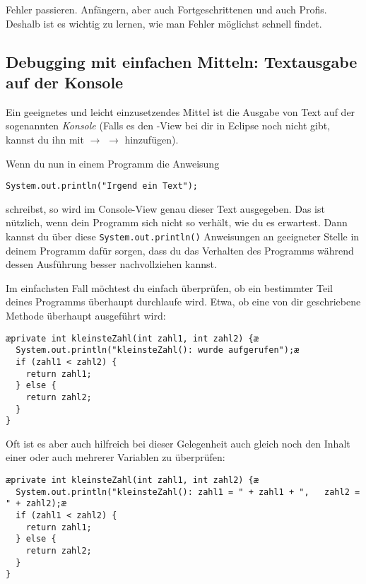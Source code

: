 Fehler passieren. Anfängern, aber auch Fortgeschrittenen und auch Profis.
Deshalb ist es wichtig zu lernen, wie man Fehler möglichst schnell findet.

\subsection{Debugging mit einfachen Mitteln: Textausgabe auf der Konsole}

Ein geeignetes und leicht einzusetzendes Mittel ist die Ausgabe von Text auf der
sogenannten \emph{Konsole} (Falls es den -View bei dir in Eclipse
noch nicht gibt, kannst du ihn mit  $\rightarrow$  $\rightarrow$  hinzufügen).

Wenn du nun in einem Programm die Anweisung

\begin{lstlisting}
System.out.println("Irgend ein Text");
\end{lstlisting}

schreibst, so wird im Console-View genau dieser Text ausgegeben. Das ist
nützlich, wenn dein Programm sich nicht so verhält, wie du es erwartest. Dann
kannst du über diese \lstinline|System.out.println()| Anweisungen an geeigneter
Stelle in deinem Programm dafür sorgen, dass du das Verhalten des Programms
während dessen Ausführung besser nachvollziehen kannst.

Im einfachsten Fall möchtest du einfach überprüfen, ob ein bestimmter Teil
deines Programms überhaupt durchlaufe wird. Etwa, ob eine von dir geschriebene
Methode überhaupt ausgeführt wird:

\begin{lstlisting}
æprivate int kleinsteZahl(int zahl1, int zahl2) {æ
  System.out.println("kleinsteZahl(): wurde aufgerufen");æ
  if (zahl1 < zahl2) {
    return zahl1;
  } else {
    return zahl2;
  }
}
\end{lstlisting}

Oft ist es aber auch hilfreich bei dieser Gelegenheit auch gleich noch den
Inhalt einer oder auch mehrerer Variablen zu überprüfen:

\begin{lstlisting}
æprivate int kleinsteZahl(int zahl1, int zahl2) {æ
  System.out.println("kleinsteZahl(): zahl1 = " + zahl1 + ",   zahl2 = " + zahl2);æ
  if (zahl1 < zahl2) {
    return zahl1;
  } else {
    return zahl2;
  }
}
\end{lstlisting}



